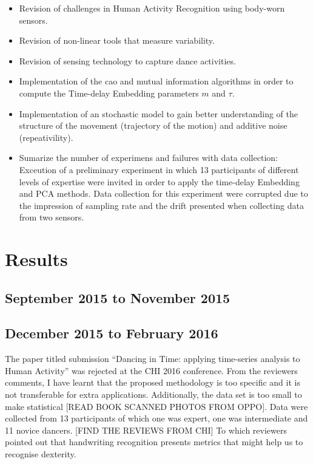 \documentclass[12pt,journal,onecolumn,compsoc]{IEEEtran}
\begin{document}
\begin{itemize}
 \item Revision of challenges in Human Activity Recognition using body-worn sensors.
 \item Revision of non-linear tools that measure variability.
 \item Revision of sensing technology to capture dance activities.
 \item Implementation of the cao and mutual information algorithms in order 
    to compute the Time-delay Embedding parameters $m$ and $\tau$.
 \item Implementation of an stochastic model to gain better understanding of the 
 structure of the movement (trajectory of the motion) and additive noise (repeativility).
 \item Sumarize the number of experimens and failures with data collection: 
 Exceution of a preliminary experiment in which 13 participants of different levels of 
 expertise were invited in order to apply the time-delay Embedding and PCA methods.
 Data collection for this experiment were corrupted due to the impression of sampling rate
 and the drift presented when collecting data from two sensors.
\end{itemize}


\section{Results}

\subsection{September 2015 to November 2015}


\subsection{December 2015 to February 2016}
The paper titled submission 
``Dancing in Time: applying time-series analysis to Human Activity''
was rejected at the CHI 2016 conference. From the reviewers comments, 
I have learnt that the proposed methodology 
is too specific and it is not transferable for extra applications.
Additionally, the data set is too small to make statistical 
[READ BOOK SCANNED PHOTOS FROM OPPO].
Data were collected from 13 participants of which 
one was expert, one was intermediate and 11 novice dancers.
[FIND THE REVIEWS FROM CHI]
To which reviewers pointed out that handwriting recognition presents metrics 
that might help us to recognise dexterity.
\end{document}

